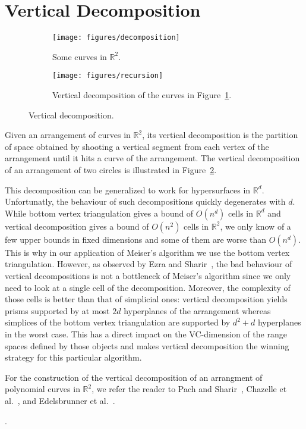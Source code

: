 \section{Vertical Decomposition}%
\label{sec:arrangements:vertical-decomposition}

\begin{figure}
	\centering{}
    \begin{subfigure}[t]{0.5\textwidth}
		\centering
		\texttt{[image: figures/decomposition]}
		\caption{Some curves in $\mathbb{R}^2$.}%
		\label{fig:some-curves-in-R2}
    \end{subfigure}%
    \begin{subfigure}[t]{0.5\textwidth}
		\centering
		\texttt{[image: figures/recursion]}
		\caption{Vertical decomposition of the curves in Figure~\ref{fig:some-curves-in-R2}.}%
    \end{subfigure}
	\caption{Vertical decomposition.}\label{fig:vd}
\end{figure}

Given an arrangement of curves in \(\mathbb{R}^2\), its vertical decomposition
is the partition of space obtained by shooting a vertical segment from each
vertex of the arrangement until it hits a curve of the arrangement. The
vertical decomposition of an arrangement of two circles is illustrated
in Figure~\ref{fig:vd}.

This decomposition can be generalized to work for hypersurfaces in
\(\mathbb{R}^d\). Unfortunatly, the behaviour of such decompositions quickly
degenerates with \(d\).
While bottom vertex triangulation gives a bound of \(O(n^d)\) cells in
\(\mathbb{R}^d\) and
vertical decomposition gives a bound of \(O(n^2)\) cells in \(\mathbb{R}^2\),
we only know of a few upper bounds in fixed dimensions and some of them are
worse than \(O(n^d)\). This is why in our application of Meiser's algorithm we
use the bottom vertex triangulation. However, as observed by Ezra and
Sharir~\cite{ES17}, the bad behaviour of vertical decompositions is not a
bottleneck of Meiser's algorithm since we only need to look at a single cell of
the decomposition. Moreover, the complexity of those cells is better than that
of simplicial ones: vertical decomposition yields prisms supported by at most
\(2d\) hyperplanes of the arrangement whereas simplices of
the bottom vertex triangulation are supported by \(d^2 + d\) hyperplanes in the
worst case. This has a direct impact on the VC-dimension of the range spaces
defined by those objects and makes vertical decomposition the winning strategy
for this particular algorithm.

For the construction of the vertical decomposition of an arrangment of
polynomial curves in \(\mathbb{R}^2\),
we refer the reader to Pach and Sharir~\cite{Alcala}, Chazelle et
al.~\cite{CEGS91}, and Edelsbrunner et al.~\cite{EGPPSS92}.

.
